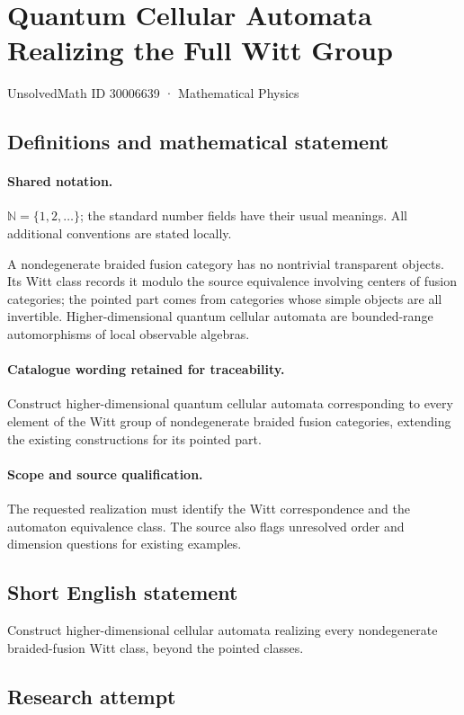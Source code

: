 \documentclass[11pt]{article}
\begin{document}
\setcounter{section}{30006638}
\section{Quantum Cellular Automata Realizing the Full Witt Group}\label{30006639}
{\small UnsolvedMath ID 30006639 · Mathematical Physics}
\subsection{Definitions and mathematical statement}

\paragraph{Shared notation.}$\mathbb N=\{1,2,\ldots\}$; the standard number fields have their usual meanings. All additional conventions are stated locally.


A nondegenerate braided fusion category has no nontrivial transparent objects. Its Witt class records it modulo the source equivalence involving centers of fusion categories; the pointed part comes from categories whose simple objects are all invertible. Higher-dimensional quantum cellular automata are bounded-range automorphisms of local observable algebras.

\paragraph{Catalogue wording retained for traceability.}
Construct higher-dimensional quantum cellular automata corresponding to every element of the Witt group of nondegenerate braided fusion categories, extending the existing constructions for its pointed part.

\paragraph{Scope and source qualification.}The requested realization must identify the Witt correspondence and the automaton equivalence class. The source also flags unresolved order and dimension questions for existing examples.
\subsection{Short English statement}
Construct higher-dimensional cellular automata realizing every nondegenerate braided-fusion Witt class, beyond the pointed classes.
\subsection{Research attempt}
\end{document}

